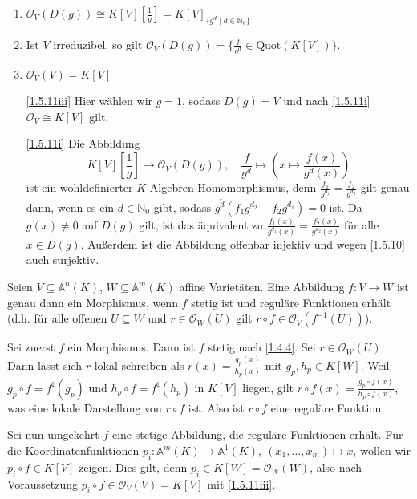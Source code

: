 \documentclass[a4paper,12pt]{scrbook}
\makeatletter
\theoremstyle{blah}
\theoremstyle{stz}
\renewcommand{\proofname}{Beweis}
\renewenvironment{proof}[1][\proofname]{\par
  \pushQED{\qed}%
  \normalfont \topsep6\p@\@plus6\p@\relax
  \trivlist
  \item[\hskip\labelsep
        \itshape
    #1\@addpunct{:}]\ignorespaces
}{%
  \popQED\endtrivlist\@endpefalse
}
\def\A{\mathbb{A}}
\def\O{\mathcal{O}}
\newcommand{\ra}{\longrightarrow}
\newcommand{\Quot}{\mathrm{Quot}}
\newcommand{\set}[1]{\ensuremath{\mathbb{#1}}}
\newcommand{\N}{\set{N}}
\renewcommand{\mapsto}{\longmapsto}
\makeatother
\begin{document}
\begin{kor}\label{1.5.11}
  \begin{enumerate}
  \item\label{1.5.11i} $\O_V(D(g))\cong K[V][\frac1g] = K[V]_{\{g^d\mid d\in\N_0\}}$
  \item\label{1.5.11ii} Ist $V$ irreduzibel, so gilt $\O_V(D(g))=\{\frac{f}{g^d}\in\Quot(K[V])\}$.
  \item\label{1.5.11iii} $\O_V(V)=K[V]$
  \end{enumerate}
\end{kor}
\begin{proof}
  \begin{enumerate}
  \item[\ref{1.5.11iii}] Hier wählen wir $g=1$, sodass $D(g)=V$ und nach \ref{1.5.11i} $\O_V\cong K[V]$ gilt.
  \item[\ref{1.5.11i}] Die Abbildung
    \[K[V][\textstyle\frac1g]\ra\O_V(D(g)),\quad \displaystyle\frac{f}{g^d}\mapsto\left(x\mapsto\frac{f(x)}{g^d(x)}\right) \]
    ist ein wohldefinierter $K$-Algebren-Homomorphismus, denn $\frac{f_1}{g^{d_1}}=\frac{f_2}{g^{d_2}}$ gilt genau dann, wenn es
    ein $\tilde{d}\in\N_0$ gibt, sodass $g^{\tilde{d}}(f_1g^{d_2}-f_2g^{d_1})=0$ ist. Da $g(x)\neq0$ auf $D(g)$ gilt, ist das
    äquivalent zu $\frac{f_1(x)}{g^{d_1}(x)}=\frac{f_2(x)}{g^{d_2}(x)}$ für alle $x\in D(g)$. Außerdem ist die Abbildung
    offenbar injektiv und wegen \autoref{1.5.10} auch surjektiv.
  \end{enumerate}
\end{proof}

\begin{prop}\label{1.5.12}
  Seien $V\subseteq\A^n(K)$, $W\subseteq\A^m(K)$ affine Varietäten. Eine Abbildung $f\colon V\ra W$ ist genau dann ein
  Morphismus, wenn $f$ stetig ist und reguläre Funktionen erhält (d.h. für alle offenen $U\subseteq W$ und $r\in\O_W(U)$ gilt
  $r\circ f\in\O_V(f^{-1}(U))$).
\end{prop}
\begin{proof}
  Sei zuerst $f$ ein Morphismus. Dann ist $f$ stetig nach \autoref{1.4.4}. Sei $r\in\O_W(U)$. Dann lässt sich $r$ lokal
  schreiben als $r(x)=\frac{g_p(x)}{h_p(x)}$ mit $g_p,h_p\in K[W]$. Weil $g_p\circ f=f^\sharp(g_p)$ und $h_p\circ
  f=f^\sharp(h_p)$ in $K[V]$ liegen, gilt $r\circ f(x)=\frac{g_p\circ f(x)}{h_p\circ f(x)}$, was eine lokale Darstellung von
  $r\circ f$ ist. Also ist $r\circ f$ eine reguläre Funktion.

  Sei nun umgekehrt $f$ eine stetige Abbildung, die reguläre Funktionen erhält. Für die Koordinatenfunktionen $p_i\colon
  \A^m(K)\ra \A^1(K),\ (x_1,\dotsc,x_m)\mapsto x_i$ wollen wir $p_i\circ f\in K[V]$ zeigen. Dies gilt, denn $p_i\in K[W] =
  \O_W(W)$, also nach Voraussetzung $p_i\circ f\in\O_V(V)=K[V]$ mit \autoref{1.5.11iii}.
\end{proof}
\end{document}
